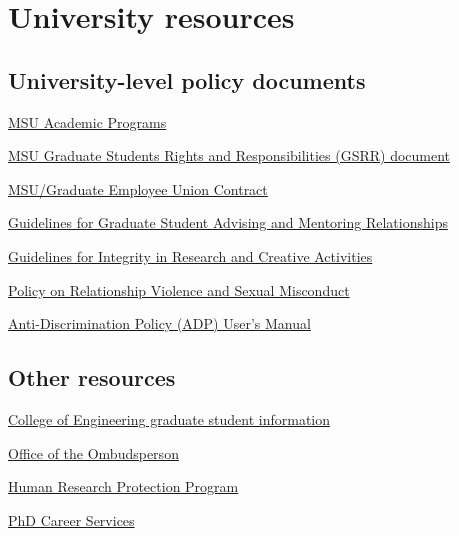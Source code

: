 \section{University resources}
\label{sec:resources}

\subsection{University-level policy documents}
\label{sec:resources_policy}


\vspace{3mm}
\noindent
\href{http://www.reg.msu.edu/ucc/ucc.asp}{MSU Academic Programs}

\vspace{3mm}
\noindent
\href{http://www.vps.msu.edu/SpLife/default.pdf}{MSU Graduate Students
  Rights and Responsibilities (GSRR) document}

\vspace{3mm}
\noindent
\href{https://www.hr.msu.edu/documents/contracts/GEU2015-2019.pdf}{MSU/Graduate
  Employee Union Contract}

\vspace{3mm}
\noindent
\href{https://grad.msu.edu/sites/default/files/content/researchintegrity/guidelines.pdf}{Guidelines for Graduate Student Advising and Mentoring Relationships}

\vspace{3mm}
\noindent
\href{https://grad.msu.edu/sites/default/files/content/researchintegrity/guidelines.pdf}{Guidelines for Integrity in Research and Creative Activities}

\vspace{3mm}
\noindent
\href{http://www.hr.msu.edu/documents/uwidepolproc/RVSM_Policy.htm}{Policy
  on Relationship Violence and Sexual Misconduct}


\vspace{3mm}
\noindent
\href{http://oie.msu.edu/policies-procedures-forms/documents/ADP\%20Users\%20Manual\%20-\%20updated\%2015.07.24.pdf}{Anti-Discrimination
                                Policy (ADP) User's Manual}

\subsection{Other resources}
\label{sec:resources_other}

\vspace{3mm}
\noindent
\href{https://www.egr.msu.edu/academics/graduate/current-students}{College
  of Engineering graduate student information}

\vspace{3mm}
\noindent
\href{http://www.msu.edu/unit/ombud/}{Office of the Ombudsperson}

\vspace{3mm}
\noindent
\href{http://hrpp.msu.edu/}{Human Research Protection Program}

\vspace{3mm}
\noindent
\href{https://grad.msu.edu/phdcareers}{PhD Career Services}
